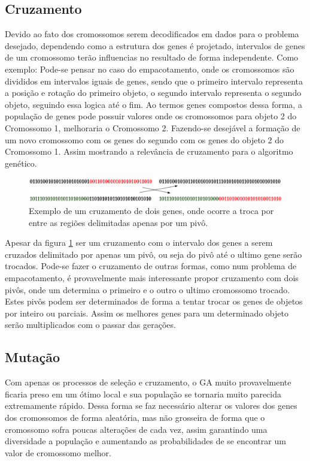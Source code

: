 \subsection{Cruzamento}
Devido ao fato dos cromossomos serem decodificados em dados para o problema desejado, dependendo como a estrutura dos genes é projetado, intervalos de genes de um cromossomo terão influencias no resultado de forma independente.\newline
Como exemplo: Pode-se pensar no caso do empacotamento, onde os cromossomos são divididos em intervalos iguais de genes, sendo que o primeiro intervalo representa a posição e rotação do primeiro objeto, o segundo intervalo representa o segundo objeto, seguindo essa logica até o fim.\newline
Ao termos genes compostos dessa forma, a população de genes pode possuir valores onde os cromossomos para objeto 2 do Cromossomo 1, melhoraria o Cromossomo 2. Fazendo-se desejável a formação de um novo cromossomo com os genes do segundo com os genes do objeto 2 do Cromossomo 1. Assim mostrando a relevância de cruzamento para o algoritmo genético.\newline
\begin{figure}[h]
    \centering
    \includegraphics[scale=0.45]{Capitulos/Cap01_figs/cruzamento_pivot.png}
    \caption{Exemplo de um cruzamento de dois genes, onde ocorre a troca por entre as regiões delimitadas apenas por um pivô.}
    \label{fig:Cap01_cruzamento_pivot_Example}
\end{figure}
\newline
Apesar da figura \ref{fig:Cap01_cruzamento_pivot_Example} ser um cruzamento com o intervalo dos genes a serem cruzados delimitado por apenas um pivô, ou seja do pivô até o ultimo gene serão trocados. Pode-se fazer o cruzamento de outras formas, como num problema de empacotamento, é provavelmente mais interessante propor cruzamento com dois pivôs, onde um determina o primeiro e o outro o ultimo cromossomo trocado. Estes pivôs podem ser determinados de forma a tentar trocar os genes de objetos por inteiro ou parciais. Assim os melhores genes para um determinado objeto serão multiplicados com o passar das gerações.

\subsection{Mutação}
Com apenas os processos de seleção e cruzamento, o GA muito provavelmente ficaria preso em um ótimo local e sua população se tornaria muito parecida extremamente rápido. Dessa forma se faz necessário alterar os valores dos genes dos cromossomos de forma aleatória, mas não grosseira de forma que o cromossomo sofra poucas alterações de cada vez, assim garantindo uma diversidade a população e aumentando as probabilidades de se encontrar um valor de cromossomo melhor.

